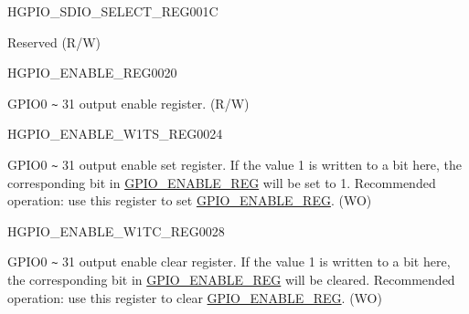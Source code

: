 \begin{register}{H}{GPIO\_SDIO\_SELECT\_REG}{\hexprefix{}001C}\label{regdesc:GPIOSDIOSELECTREG}
%
%
\regnewline%
\begin{regdesc}\begin{reglist}
\label{fielddesc:GPIOSDIOSEL}\item [GPIO\_SDIO\_SEL] Reserved (R/W)
\end{reglist}\end{regdesc}
\end{register}


\begin{register}{H}{GPIO\_ENABLE\_REG}{\hexprefix{}0020}\label{regdesc:GPIOENABLEREG}
%
\regnewline%
\begin{regdesc}\begin{reglist}
\label{fielddesc:GPIOENABLEDATA}\item [GPIO\_ENABLE\_DATA] GPIO0 \verb+~+ 31 output enable register. (R/W)
\end{reglist}\end{regdesc}
\end{register}


\begin{register}{H}{GPIO\_ENABLE\_W1TS\_REG}{\hexprefix{}0024}\label{regdesc:GPIOENABLEW1TSREG}
%
\regnewline%
\begin{regdesc}\begin{reglist}
\label{fielddesc:GPIOENABLEW1TS}\item [GPIO\_ENABLE\_W1TS] GPIO0 \verb+~+ 31 output enable set register. If the value 1 is written to a bit here, the corresponding bit in \hyperref[regdesc:GPIOENABLEREG]{GPIO\_ENABLE\_REG} will be set to 1. Recommended operation: use this register to set \hyperref[regdesc:GPIOENABLEREG]{GPIO\_ENABLE\_REG}. (WO)
\end{reglist}\end{regdesc}
\end{register}


\begin{register}{H}{GPIO\_ENABLE\_W1TC\_REG}{\hexprefix{}0028}\label{regdesc:GPIOENABLEW1TCREG}
%
\regnewline%
\begin{regdesc}\begin{reglist}
\label{fielddesc:GPIOENABLEW1TC}\item [GPIO\_ENABLE\_W1TC] GPIO0 \verb+~+ 31 output enable clear register. If the value 1 is written to a bit here, the corresponding bit in \hyperref[regdesc:GPIOENABLEREG]{GPIO\_ENABLE\_REG} will be cleared. Recommended operation: use this register to clear \hyperref[regdesc:GPIOENABLEREG]{GPIO\_ENABLE\_REG}. (WO)
\end{reglist}\end{regdesc}
\end{register}


